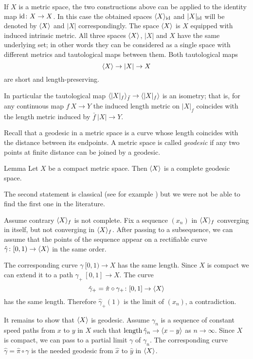 \documentclass{article}
\begin{document}
If $X$ is a metric space, the two constructions above can be applied to the identity map $\mathrm{id}\colon X\to X$.
In this case the obtained spaces $\langle X\rangle_{\mathrm{id}}$ and $|X|_{\mathrm{id}}$ will be denoted by $\langle X\rangle$ and $|X|$ correspondingly.
The space $\langle X\rangle$ is $X$ equipped with induced intrinsic metric.
All three spaces $\langle X\rangle$, $|X|$ and $X$ have the same underlying set;
in other words they can be considered as a single space with different metrics and tautological maps between them.
Both tautological maps 
\[\langle X\rangle\to |X|\to X\]
are short and length-preserving.

In particular the tautological map $\<|X|_f\>_{\bar f}\zz\to \<|X|_f\>$ is an isometry;
that is, for any continuous map $f\:X\to Y$ the induced length metric on $|X|_f$ coincides with the length metric induced by 
$\bar f\:|X|\to Y$.


Recall that a geodesic in a metric space is a curve whose length coincides with the distance between its endpoints.
A metric space is called \emph{geodesic} if any two points at finite distance can be joined by a geodesic.

\begin{thm}{Lemma}\label{lem:geospace}
Let $X$ be a compact metric space. 
Then $\langle X\rangle$ is a complete geodesic space.
\end{thm}

The second statement is classical (see for example \cite[II-\S8 Thm. 3]{KF}) but 
we were not be able to find the first one in the literature.

Assume contrary $\langle X\rangle_f$ is not complete.
Fix a sequence $(x_n)$ in $\langle X\rangle_f$ converging in itself, but not converging in $\langle X\rangle_f$.
After passing to a subsequence, we can assume that the points of the sequence appear on a rectifiable curve $\hat\gamma\colon[0,1)\to\langle X\rangle$ in the same order.

The corresponding curve $\gamma\:[0,1)\to X$ has the same length.
Since $X$ is compact we can extend it to a path $\gamma_+\:[0,1]\to X$.
The curve 
\[\hat\gamma_+=\hat\pi\circ\gamma_+\colon[0,1]\to\langle X\rangle\]
has the same length.
Therefore $\hat\gamma_+(1)$ is the limit of $(x_n)$, a contradiction.

It remains to show that $\langle X\rangle$ is geodesic.
Assume $\gamma_n$ is a sequence of constant speed paths from $x$ to $y$ in $X$
such that $\mathop{\rm length}\nolimits\hat\gamma_n\to \langle x-y\rangle$ as $n\to\infty$.
Since $X$ is compact, we can pass to a partial limit $\gamma$ of  $\gamma_n$.
The corresponding curve $\hat\gamma=\hat \pi\circ\gamma$ is the needed geodesic from $\hat x$ to $\hat y$ in $\langle X\rangle$.
\qeds
\end{document}
